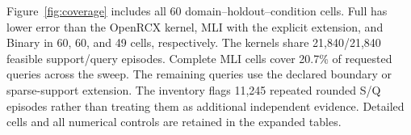 Figure~\ref{fig:coverage} includes all 60 domain--holdout--condition cells. Full has lower error than the OpenRCX kernel, MLI with the explicit extension, and Binary in 60, 60, and 49 cells, respectively. The kernels share 21,840/21,840 feasible support/query episodes. Complete MLI cells cover 20.7\% of requested queries across the sweep. The remaining queries use the declared boundary or sparse-support extension. The inventory flags 11,245 repeated rounded S/Q episodes rather than treating them as additional independent evidence. Detailed cells and all numerical controls are retained in the expanded tables.
